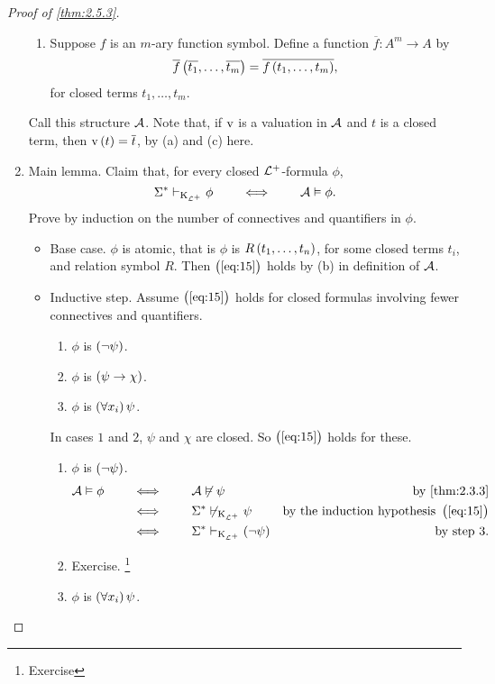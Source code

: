 \begin{proof}[Proof of \ref{thm:2.5.3}]
\begin{enumerate}[leftmargin=0.5in, label=Step \arabic*.]
\begin{enumerate}
\item Suppose $ f $ is an $ m $-ary function symbol. Define a function $ \overline{f} : A^m \to A $ by
$$ \overline{f}\br{\overline{t_1}, \dots, \overline{t_m}} = \overline{f\br{t_1, \dots, t_m}}, $$
for closed terms $ t_1, \dots, t_m $.
\end{enumerate}
Call this structure $ \mathcal{A} $. Note that, if $ \mathrm{v} $ is a valuation in $ \mathcal{A} $ and $ t $ is a closed term, then $ \v\br{t} = \overline{t} $, by (a) and (c) here.
\pagebreak
\item Main lemma. Claim that, for every closed $ \mathcal{L}^+ $-formula $ \phi $,
\begin{equation}
\label{eq:15}
\Sigma^* \vdash_{\mathrm{K}_{\mathcal{L}^+}} \phi \qquad \iff \qquad \mathcal{A} \vDash \phi.
\end{equation}
Prove by induction on the number of connectives and quantifiers in $ \phi $.
\begin{itemize}
\item Base case. $ \phi $ is atomic, that is $ \phi $ is $ R\br{t_1, \dots, t_n} $, for some closed terms $ t_i $, and relation symbol $ R $. Then $ \br{\ref{eq:15}} $ holds by (b) in definition of $ \mathcal{A} $.
\item Inductive step. Assume $ \br{\ref{eq:15}} $ holds for closed formulas involving fewer connectives and quantifiers.
\begin{enumerate}[leftmargin=0.5in, label=Case \arabic*.]
\item $ \phi $ is $ \notb{\psi} $.
\item $ \phi $ is $ \impb{\psi}{\chi} $.
\item $ \phi $ is $ \fab{x_i}\psi $.
\end{enumerate}
In cases $ 1 $ and $ 2 $, $ \psi $ and $ \chi $ are closed. So $ \br{\ref{eq:15}} $ holds for these.
\begin{enumerate}[leftmargin=0.5in, label=Case \arabic*.]
\item $ \phi $ is $ \notb{\psi} $.
\begin{align*}
\AAA \vDash \phi \qquad
& \iff \qquad \AAA \not\vDash \psi & \text{by \ref{thm:2.3.3}} \\
& \iff \qquad \Sigma^* \not\vdash_{\K_{\LLL^+}} \psi & \text{by the induction hypothesis} \ \br{\ref{eq:15}} \\
& \iff \qquad \Sigma^* \vdash_{\K_{\LLL^+}} \notb{\psi} & \text{by step} \ 3.
\end{align*}
\item Exercise. \footnote{Exercise}
\item $ \phi $ is $ \fab{x_i}\psi $.

\end{enumerate}
\end{itemize}
\end{enumerate}
\end{proof}
